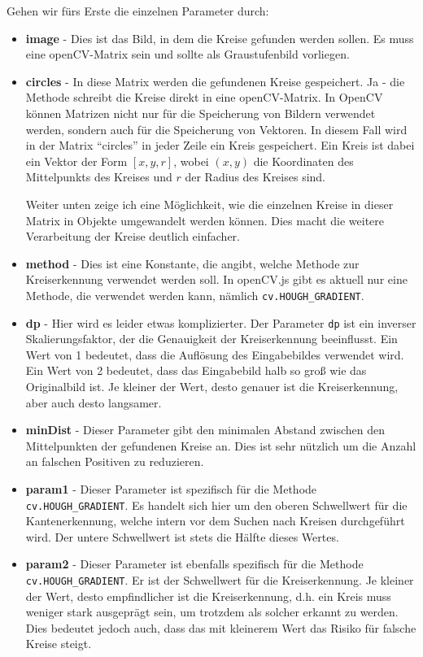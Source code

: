 Gehen wir fürs Erste die einzelnen Parameter durch:
\begin{itemize}[label={}]
    \item \textbf{image} - Dies ist das Bild, in dem die Kreise gefunden werden sollen. Es muss eine openCV-Matrix sein und sollte als Graustufenbild vorliegen.
    \item \textbf{circles} - In diese Matrix werden die gefundenen Kreise gespeichert. Ja - die Methode schreibt die Kreise direkt in eine openCV-Matrix. In OpenCV können Matrizen nicht nur für die Speicherung von Bildern verwendet werden, sondern auch für die Speicherung von Vektoren. In diesem Fall wird in der Matrix \enquote{circles} in jeder Zeile ein Kreis gespeichert. Ein Kreis ist dabei ein Vektor der Form \([x, y, r]\), wobei \((x, y)\) die Koordinaten des Mittelpunkts des Kreises und \(r\) der Radius des Kreises sind.
    
    Weiter unten zeige ich eine Möglichkeit, wie die einzelnen Kreise in dieser Matrix in Objekte umgewandelt werden können. Dies macht die weitere Verarbeitung der Kreise deutlich einfacher.
    \item \textbf{method} - Dies ist eine Konstante, die angibt, welche Methode zur Kreiserkennung verwendet werden soll. In openCV.js gibt es aktuell nur eine Methode, die verwendet werden kann, nämlich \texttt{cv.HOUGH\_GRADIENT}.
    \item \textbf{dp} - Hier wird es leider etwas komplizierter. Der Parameter \texttt{dp} ist ein inverser Skalierungsfaktor, der die Genauigkeit der Kreiserkennung beeinflusst. Ein Wert von 1 bedeutet, dass die Auflösung des Eingabebildes verwendet wird. Ein Wert von 2 bedeutet, dass das Eingabebild halb so groß wie das Originalbild ist. Je kleiner der Wert, desto genauer ist die Kreiserkennung, aber auch desto langsamer. 
    \item \textbf{minDist} - Dieser Parameter gibt den minimalen Abstand zwischen den Mittelpunkten der gefundenen Kreise an. Dies ist sehr nützlich um die Anzahl an falschen Positiven zu reduzieren. 
    \item \textbf{param1} - Dieser Parameter ist spezifisch für die Methode \texttt{cv.HOUGH\_GRADIENT}. Es handelt sich hier um den oberen Schwellwert für die Kantenerkennung, welche intern vor dem Suchen nach Kreisen durchgeführt wird. Der untere Schwellwert ist stets die Hälfte dieses Wertes.
    \item \textbf{param2} - Dieser Parameter ist ebenfalls spezifisch für die Methode \texttt{cv.HOUGH\_GRADIENT}. Er ist der Schwellwert für die Kreiserkennung. Je kleiner der Wert, desto empfindlicher ist die Kreiserkennung, d.h. ein Kreis muss weniger stark ausgeprägt sein, um trotzdem als solcher erkannt zu werden. Dies bedeutet jedoch auch, dass das mit kleinerem Wert das Risiko für falsche Kreise steigt.
\end{itemize}

